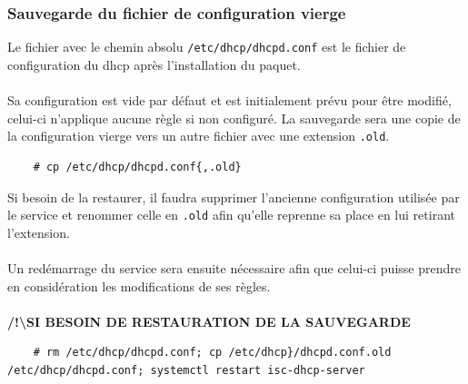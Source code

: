 \documentclass[a4paper]{article}
\begin{document}
\subsubsection{Sauvegarde du fichier de configuration vierge}
Le fichier avec le chemin absolu \verb|/etc/dhcp/dhcpd.conf| est le fichier de configuration du \gls{dhcp} après l'installation du paquet.\\\\Sa configuration est vide par défaut et est initialement prévu pour être modifié, celui-ci n'applique aucune règle si non configuré.
\newpage 
La sauvegarde sera une copie de la configuration vierge vers un autre fichier avec une extension \verb|.old|.
\begin{lstlisting}
    # cp /etc/dhcp/dhcpd.conf{,.old}
\end{lstlisting}
Si besoin de la restaurer, il faudra supprimer l'ancienne configuration utilisée par le service et renommer celle en \verb|.old| afin qu'elle reprenne sa place en lui retirant l'extension.\\\\Un redémarrage du service sera ensuite nécessaire afin que celui-ci puisse prendre en considération les modifications de ses règles.\\\\
\textbf{/!\textbackslash SI BESOIN DE RESTAURATION DE LA SAUVEGARDE}
\begin{lstlisting}
    # rm /etc/dhcp/dhcpd.conf; cp /etc/dhcp}/dhcpd.conf.old /etc/dhcp/dhcpd.conf; systemctl restart isc-dhcp-server
\end{lstlisting}
\end{document}
